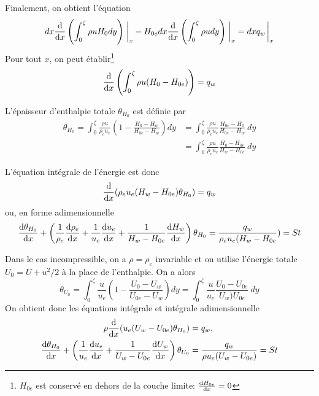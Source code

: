     Finalement, on obtient l'équation
    \begin{equation}
      dx\dv{x} \left(\int_0^\zeta \rho u H_0 dy\right) \eval_x - H_{0e} dx \dv{x}\left(\int_0^\zeta \rho u dy \right) \eval_x = dx q_w \eval_x
    \end{equation}
    Pour tout $x$, on peut établir\footnote{$H_{0e}$ est conservé en dehors de la couche limite: $\dv{H_{0e}}{x} = 0$}
    \begin{equation}
      \dv{x}\left(\int_0^\zeta \rho u (H_0 - H_{0e})\right) = q_w
    \end{equation}

    L'épaisseur d'enthalpie totale $\theta_{H_0}$ est définie par
    \begin{equation}
      \begin{aligned}
        \theta_{H_0} = \int_0^\zeta \frac{\rho u}{\rho_e u_e} \left(1 - \frac{H_0 - H_w}{H_{0e} - H_w} \right) dy &= \int_0^\zeta \frac{\rho u}{\rho_e u_e} \frac{H_{0e} - H_0}{H_{0e} - H_w} ~dy\\
        &= \int_0^\zeta \frac{\rho u}{\rho_e u_e} \frac{H_0 - H_{0e}}{H_w - H_{0e}} ~dy
      \end{aligned}
    \end{equation}

    L'équation intégrale de l'énergie est donc
    \begin{equation}
      \dv{x} (\rho_e u_e (H_w - H_{0e}) \theta_{H_0}) = q_w
    \end{equation}
    ou, en forme adimensionnelle
    \begin{equation}
      \dv{\theta_{H_0}}{x} + \left(\frac{1}{\rho_e} \dv{\rho_e}{x} + \frac{1}{u_e} \dv{u_e}{x} + \frac{1}{H_w - H_{0e}} \dv{H_w}{x}\right) \theta_{H_0} = \frac{q_w}{\rho_e u_e (H_w - H_{0e}}) = St
    \end{equation}

    Dans le cas incompressible, on a $\rho = \rho_e$ invariable et on utilise l'énergie totale $U_0 = U + u^2/2$ à la place de l'enthalpie. On a alors
    \begin{equation}
      \theta_{U_0} = \int_0^\zeta \frac{u}{u_e}\left(1 - \frac{U_0 - U_w}{U_{0e} - U_w}\right) dy = \int_0^\zeta \frac{u}{u_e} \frac{U_0 - U_{0e}}{U_w ) U_{0e}} ~dy
    \end{equation}
    On obtient donc les équations intégrale et intégrale adimensionnelle
    \begin{align}
      \rho \dv{x} (u_e (U_w - U_{0e})\theta_{H_0}) &= q_w,\\
      \dv{\theta_{H_0}}{x} + \left(\frac{1}{u_e} \dv{u_e}{x} + \frac{1}{U_w - U_{0e}}\dv{U_w}{x}\right) \theta_{U_0} &= \frac{q_w}{\rho u_e (U_w - U_{0e})} = St
    \end{align}
